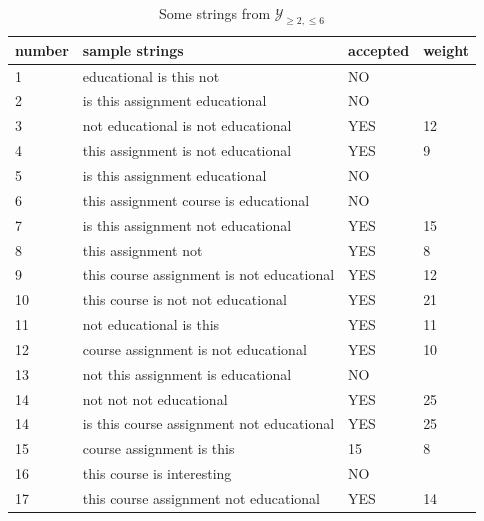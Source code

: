\documentclass{article}
\begin{document}
\begin{enumerate}[label = (\alph*)]
    
\begin{table}[h]
\item
        \centering
        \fontsize{10}{10}\selectfont
        \renewcommand{\arraystretch}{1.2} %
        \setlength{\tabcolsep}{0.5em} %
        \begin{tabular}{l|l|l|l}
        \textbf{number} & \textbf{sample strings} & \textbf{accepted} & \textbf{weight} \\ \hline
        1 & educational is this not & NO &  \\
        2 & is this assignment educational & NO  &  \\
        3 & not educational is not educational & YES  & 12  \\
        4 & this assignment is not educational &  YES & 9  \\
        5 & is this assignment educational & NO &  \\
        6 & this assignment course is educational & NO  &  \\
        7 & is this assignment not educational & YES & 15  \\
        8 & this assignment not & YES & 8  \\
        9 & this course assignment is not educational & YES & 12  \\
        10 & this course is not not educational & YES & 21 \\
        11 & not educational is this & YES & 11 \\
        12 & course assignment is not educational & YES & 10 \\
        13 & not this assignment is educational & NO &  \\
        14 & not not not educational & YES & 25 \\
        14 & is this course assignment not educational & YES & 25 \\
        15 & course assignment is this & 15 & 8 \\
        16 & this course is interesting & NO &  \\
        17 & this course assignment not educational & YES & 14
        \end{tabular}
        \caption{Some strings from $\mathcal{Y}_{\geq 2, \leq 6}$}
        \label{tab:wfst_strings}
        \end{table}
      

\end{enumerate}
\end{document}
